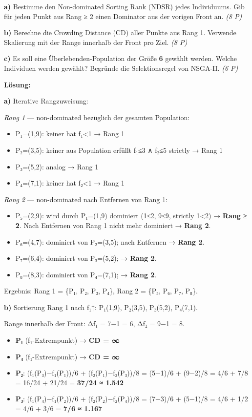 \documentclass[11pt, a4paper]{article}
\begin{document}
\textbf{a)} Bestimme den Non-dominated Sorting Rank (NDSR) jedes Individuums. Gib für jeden Punkt aus Rang ≥ 2 einen Dominator aus der vorigen Front an. \textit{(8 P)}


\textbf{b)} Berechne die Crowding Distance (CD) aller Punkte aus Rang 1. Verwende Skalierung mit der Range innerhalb der Front pro Ziel. \textit{(8 P)}


\textbf{c)} Es soll eine Überlebenden-Population der Größe \textbf{6} gewählt werden. Welche Individuen werden gewählt? Begründe die Selektionsregel von NSGA-II. \textit{(6 P)}


\textbf{Lösung:}


\textbf{a)} Iterative Rangzuweisung:


\textit{Rang 1} — non-dominated bezüglich der gesamten Population:

\begin{itemize}
  \item P₁=(1,9): keiner hat f₁<1 → Rang 1
  \item P₂=(3,5): keiner aus Population erfüllt f₁≤3 ∧ f₂≤5 strictly → Rang 1
  \item P₃=(5,2): analog → Rang 1
  \item P₄=(7,1): keiner hat f₂<1 → Rang 1
\end{itemize}

\textit{Rang 2} — non-dominated nach Entfernen von Rang 1:

\begin{itemize}
  \item P₅=(2,9): wird durch P₁=(1,9) dominiert (1≤2, 9≤9, strictly 1<2) → \textbf{Rang ≥ 2}. Nach Entfernen von Rang 1 nicht mehr dominiert → \textbf{Rang 2}.
  \item P₆=(4,7): dominiert von P₂=(3,5); nach Entfernen → \textbf{Rang 2}.
  \item P₇=(6,4): dominiert von P₃=(5,2); → \textbf{Rang 2}.
  \item P₈=(8,3): dominiert von P₄=(7,1); → \textbf{Rang 2}.
\end{itemize}

Ergebnis: Rang 1 = \{P₁, P₂, P₃, P₄\}, Rang 2 = \{P₅, P₆, P₇, P₈\}.


\textbf{b)} Sortierung Rang 1 nach f₁↑: P₁(1,9), P₂(3,5), P₃(5,2), P₄(7,1).

Range innerhalb der Front: Δf₁ = 7−1 = 6, Δf₂ = 9−1 = 8.


\begin{itemize}
  \item \textbf{P₁} (f₁-Extrempunkt) → \textbf{CD = ∞}
  \item \textbf{P₄} (f₁-Extrempunkt) → \textbf{CD = ∞}
  \item \textbf{P₂}: (f₁(P₃)−f₁(P₁))/6 + (f₂(P₁)−f₂(P₃))/8 = (5−1)/6 + (9−2)/8 = 4/6 + 7/8 = 16/24 + 21/24 = \textbf{37/24 ≈ 1.542}
  \item \textbf{P₃}: (f₁(P₄)−f₁(P₂))/6 + (f₂(P₂)−f₂(P₄))/8 = (7−3)/6 + (5−1)/8 = 4/6 + 1/2 = 4/6 + 3/6 = \textbf{7/6 ≈ 1.167}
\end{itemize}
\end{document}
